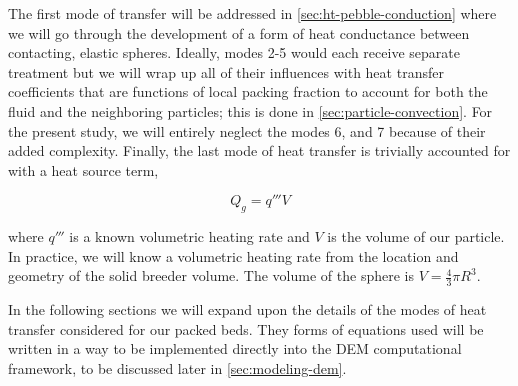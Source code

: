 The first mode of transfer will be addressed in \cref{sec:ht-pebble-conduction} where we will go through the development of a form of heat conductance between contacting, elastic spheres. Ideally, modes 2-5 would each receive separate treatment but we will wrap up all of their influences with heat transfer coefficients that are functions of local packing fraction to account for both the fluid and the neighboring particles; this is done in \cref{sec:particle-convection}. For the present study, we will entirely neglect the modes 6, and 7 because of their added complexity. Finally, the last mode of heat transfer is trivially accounted for with a heat source term,

\begin{equation}\label{eq:nuclear-heating-term}
	Q_g = q'''V
\end{equation}

where $q'''$ is a known volumetric heating rate and $V$ is the volume of our particle. In practice, we will know a volumetric heating rate from the location and geometry of the solid breeder volume. The volume of the sphere is $V = \frac{4}{3}\pi R^3$.

In the following sections we will expand upon the details of the modes of heat transfer considered for our packed beds. They forms of equations used will be written in a way to be implemented directly into the DEM computational framework, to be discussed later in \cref{sec:modeling-dem}.










